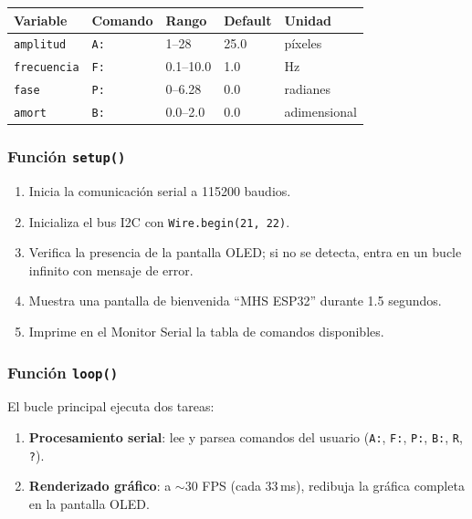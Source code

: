 \documentclass[12pt,a4paper]{article}
\begin{document}
\begin{center}
\begin{tabular}{lllll}
\toprule
\textbf{Variable} & \textbf{Comando} & \textbf{Rango} & \textbf{Default} & \textbf{Unidad} \\
\midrule
\texttt{amplitud} & \texttt{A:} & 1--28 & 25.0 & píxeles \\
\texttt{frecuencia} & \texttt{F:} & 0.1--10.0 & 1.0 & Hz \\
\texttt{fase} & \texttt{P:} & 0--6.28 & 0.0 & radianes \\
\texttt{amort} & \texttt{B:} & 0.0--2.0 & 0.0 & adimensional \\
\bottomrule
\end{tabular}
\end{center}

\subsubsection*{Función \texttt{setup()}}

\begin{enumerate}
    \item Inicia la comunicación serial a 115200 baudios.
    \item Inicializa el bus I2C con \texttt{Wire.begin(21, 22)}.
    \item Verifica la presencia de la pantalla OLED; si no se detecta, entra en un bucle infinito con mensaje de error.
    \item Muestra una pantalla de bienvenida ``MHS ESP32'' durante 1.5 segundos.
    \item Imprime en el Monitor Serial la tabla de comandos disponibles.
\end{enumerate}

\subsubsection*{Función \texttt{loop()}}

El bucle principal ejecuta dos tareas:
\begin{enumerate}
    \item \textbf{Procesamiento serial}: lee y parsea comandos del usuario (\texttt{A:}, \texttt{F:}, \texttt{P:}, \texttt{B:}, \texttt{R}, \texttt{?}).
    \item \textbf{Renderizado gráfico}: a $\sim$30 FPS (cada 33\,ms), redibuja la gráfica completa en la pantalla OLED.
\end{enumerate}
\end{document}
